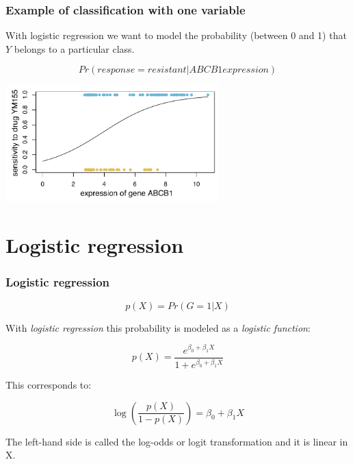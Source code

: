 \documentclass[notes]{beamer}          %
\begin{document}
\begin{frame}
\frametitle{Example of classification with one variable}

With logistic regression we want to model the probability (between 0 and 1) that $Y$ belongs to a particular class.

\begin{equation*}
Pr(response = resistant|ABCB1expression)
\end{equation*}


\begin{center}
\includegraphics[height=4.5cm]{../figures/week_2_linear_models/GDSC_one_variable_example_logistic_regression_3.pdf}
\end{center}

\end{frame}


\section{Logistic regression}
\begin{frame}
\frametitle{Logistic regression}

\begin{equation*}
p(X) = Pr(G = 1|X)
\end{equation*}

With \textit{logistic regression} this probability is modeled as a \textit{logistic function}:

\begin{equation*}
p(X) = \frac{e^{\beta_0 + \beta_1X}}{1+e^{\beta_0 + \beta_1X}}
\end{equation*}

This corresponds to:

\begin{equation*}
\log \left(\frac{p(X)}{1-p(X)}\right)  = \beta_0 + \beta_1X
\end{equation*}

The left-hand side is called the log-odds or logit transformation and it is linear in X.

\end{frame}
\end{document}
